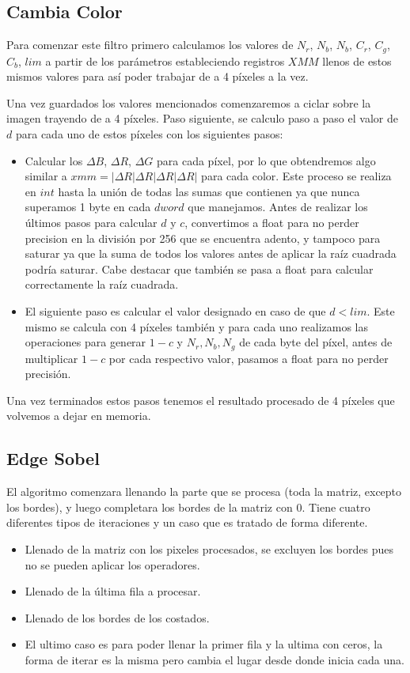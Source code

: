\subsection{Cambia Color}

Para comenzar este filtro primero calculamos los valores de $N_r$, $N_b$, $N_b$, $C_r$, $C_g$, $C_b$, $lim$ a partir de los parámetros estableciendo registros $XMM$ llenos de estos mismos valores para así poder trabajar de a 4 píxeles a la vez. 

Una vez guardados los valores mencionados comenzaremos a ciclar sobre la imagen trayendo de a 4 píxeles. Paso siguiente, se calculo paso a paso el valor de $d$ para cada uno de estos píxeles con los siguientes pasos:

\begin{itemize}
  \item Calcular los $\Delta B$, $\Delta R$, $\Delta G$ para cada píxel, por lo que obtendremos algo similar a $xmm = | \Delta R | \Delta R | \Delta R | \Delta R |$ para cada color. Este proceso se realiza en $int$ hasta la unión de todas las sumas que contienen ya que nunca superamos 1 byte en cada $dword$ que manejamos. Antes de realizar los últimos pasos para calcular $d$ y $c$, convertimos a float para no perder precision en la división por 256 que se encuentra adento, y tampoco para saturar ya que la suma de todos los valores antes de aplicar la raíz cuadrada podría saturar. Cabe destacar que también se pasa a float para calcular correctamente la raíz cuadrada. 
  \item El siguiente paso es calcular el valor designado en caso de que $d<lim$. Este mismo se calcula con 4 píxeles también y para cada uno realizamos las operaciones para generar $1-c$ y $N_r,N_b,N_g$ de cada byte del píxel, antes de multiplicar $1-c$ por cada respectivo valor, pasamos a float para no perder precisión. 
\end{itemize}

Una vez terminados estos pasos tenemos el resultado procesado de 4 píxeles que volvemos a dejar en memoria.


\subsection{Edge Sobel}
El algoritmo comenzara llenando la parte que se procesa (toda la matriz, excepto los bordes),
y luego completara los bordes de la matriz con 0.
Tiene cuatro diferentes tipos de iteraciones y un caso que es tratado de forma diferente.
\begin{itemize}
\item Llenado de la matriz con los pixeles procesados, se excluyen los bordes pues no se pueden aplicar los operadores.
\item Llenado de la última fila a procesar.
\item Llenado de los bordes de los costados.
\item El ultimo caso es para poder llenar la primer fila y la ultima con ceros, la forma de iterar es la misma pero cambia el lugar desde donde inicia cada una.
\end{itemize}
